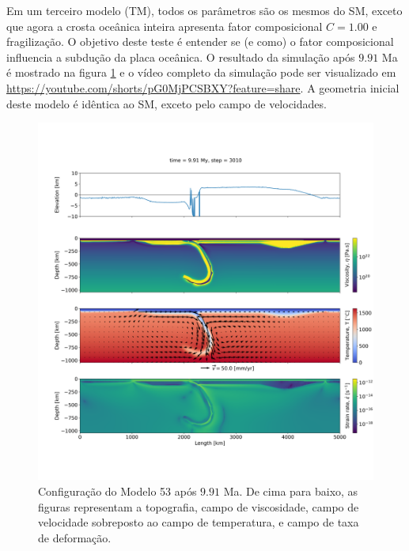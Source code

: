 
Em um terceiro modelo (TM), todos os parâmetros são os mesmos do SM, exceto que agora a crosta oceânica inteira apresenta fator composicional $C=1.00$ e fragilização. O objetivo deste teste é entender se (e como) o fator composicional influencia a subdução da placa oceânica. O resultado da simulação após $9.91$ Ma é mostrado na figura \ref{fig:stra_53-11} e o vídeo completo da simulação pode ser visualizado em \url{https://youtube.com/shorts/pG0MjPCSBXY?feature=share}. A geometria inicial deste modelo é idêntica ao SM, exceto pelo campo de velocidades.


\begin{figure}
    \centering
    \includegraphics[trim={1.5cm 3.5cm 0.0cm 4cm}, clip, width=1.0 \textwidth]{fig/strak_53-11.png}
    \caption{Configuração do Modelo 53 após $9.91$ Ma. De cima para baixo, as figuras representam a topografia, campo de viscosidade, campo de velocidade sobreposto ao campo de temperatura, e campo de taxa de deformação.}
    \label{fig:stra_53-11}
\end{figure}

